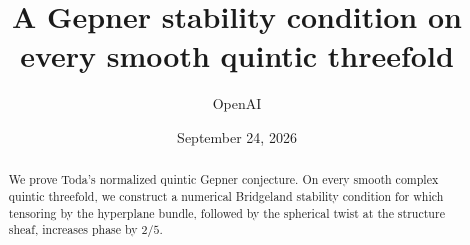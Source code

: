 \documentclass[11pt]{article}
\title{A Gepner stability condition on every smooth quintic threefold}
\author{OpenAI}
\date{September 24, 2026}
\numberwithin{equation}{section}
\theoremstyle{definition}
\theoremstyle{remark}
\begin{document}
\maketitle
\begin{abstract}
We prove Toda's normalized quintic Gepner conjecture. On every smooth complex
quintic threefold, we construct a numerical Bridgeland stability condition for
which tensoring by the hyperplane bundle, followed by the spherical twist at
the structure sheaf, increases phase by $2/5$.
\end{abstract}




\appendix



\end{document}
